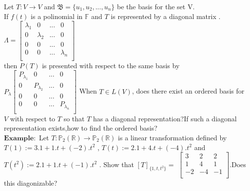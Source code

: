 \documentclass[12pt]{article}
\theoremstyle{definition}
\begin{document}
	Let $ T:V\to V $ and $ \mathfrak{B} =\{u_{1},u_{2},...,u_{n}\} $ be the basis for the set V.\\
	If $f(t)$ is a polinomial in $\mathbb{F}$ and $T$ is represented by a diagonal matrix . 
	$
	\Lambda =
	\begin{bmatrix}
	\lambda_{1} & 0 &... & 0 \\
	0 & \lambda_2 & ... & 0 \\
	0 & 0 & ... & 0 \\
	0 & 0 & ... &  \lambda_n  \\
	\end{bmatrix}
	$
	\\
	then $P(T)$ is presented with respect to the same basis by 
	$
	P_{\lambda}
	\begin{bmatrix}
	P_{\lambda_{1}} & 0 &... & 0 \\
	0 & P_{\lambda_2} & ... & 0 \\
	0 & 0 & ... & 0 \\
	0 & 0 & ... &  P_{\lambda_n}  \\
	\end{bmatrix}
	$
	When $T \in L(V)$, does there exist an ordered basis for $V$ with respect to $T$ so that $T$ has a diagonal representation?If such a diagonal representation exists,how to find the ordered basis?\\
	$\mathbf{Example:}$
	Let $ T : \mathbb{P}_{2}(\mathbb{R})\to\mathbb{P}_{2}(\mathbb{R}) $ is a linear transformation defined by $ T(1):=3.1+1.t+(-2).t^2$ , $T(t):=2.1+4.t+(-4).t^2$  and $T(t^2):=2.1+1.t+(-1).t^2 $ . Show that $[T]_{\{1,t,t^2\}}=$
	$	
	\begin{bmatrix}
	3&2&2\\
	1&4&1\\
	-2&-4&-1\\
	\end{bmatrix}	
	$.Does this diagonizable?\\
\end{document}
